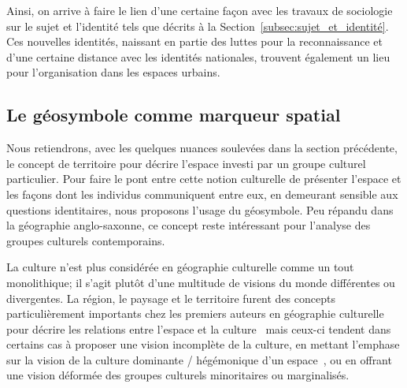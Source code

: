 Ainsi, on arrive à faire le lien d'une certaine façon avec les travaux de sociologie sur le sujet et l'identité tels que décrits à la Section~\ref{subsec:sujet_et_identité}. 
Ces nouvelles identités, naissant en partie des luttes pour la reconnaissance et d'une certaine distance avec les identités nationales, trouvent également un lieu pour l'organisation dans les espaces urbains.





\subsection{Le géosymbole comme marqueur spatial}
\label{sec:le_symbole_comme_marqueur_spatial} Nous retiendrons, avec les quelques nuances soulevées dans la section précédente, le concept de territoire pour décrire l'espace investi par un groupe culturel particulier. 
Pour faire le pont entre cette notion culturelle de présenter l'espace et les façons dont les individus communiquent entre eux, en demeurant sensible aux questions identitaires, nous proposons l'usage du géosymbole. 
Peu répandu dans la géographie anglo-saxonne, ce concept reste intéressant pour l'analyse des groupes culturels contemporains.

La culture n'est plus considérée en géographie culturelle comme un tout monolithique; il s'agit plutôt d'une multitude de visions du monde différentes ou divergentes. 
La région, le paysage et le territoire furent des concepts particulièrement importants chez les premiers auteurs en géographie culturelle pour décrire les relations entre l'espace et la culture~\citep{Bonnemaison1981,Monnet1998,DiMeo1998,} mais ceux-ci tendent dans certains cas à proposer une vision incomplète de la culture, en mettant l'emphase sur la vision de la culture dominante / hégémonique d'un espace~\citep[11-12]{Duncan1993}, ou en offrant une vision déformée des groupes culturels minoritaires ou marginalisés.

